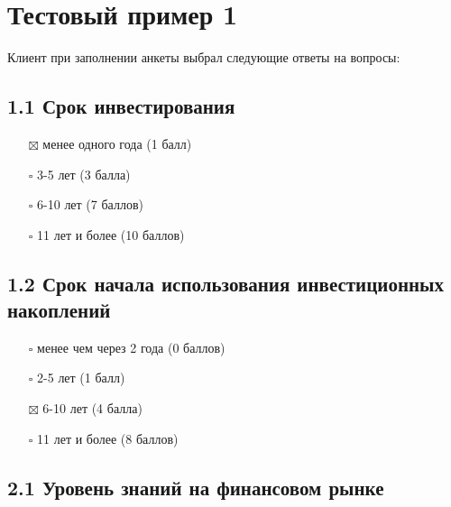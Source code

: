 \documentclass[11pt]{article}
\providecommand{\tightlist}{%
      \setlength{\itemsep}{0pt}\setlength{\parskip}{0pt}}
\begin{document}
    \section{Тестовый пример
1}\label{ux442ux435ux441ux442ux43eux432ux44bux439-ux43fux440ux438ux43cux435ux440-1}

Клиент при заполнении анкеты выбрал следующие ответы на вопросы:

\subsection{1.1 Срок
инвестирования}\label{ux441ux440ux43eux43a-ux438ux43dux432ux435ux441ux442ux438ux440ux43eux432ux430ux43dux438ux44f}

\begin{itemize}
\tightlist
\item[$\boxtimes$]
  менее одного года (1 балл)
\item[$\square$]
  3-5 лет (3 балла)
\item[$\square$]
  6-10 лет (7 баллов)
\item[$\square$]
  11 лет и более (10 баллов)
\end{itemize}

\subsection{1.2 Срок начала использования инвестиционных
накоплений}\label{ux441ux440ux43eux43a-ux43dux430ux447ux430ux43bux430-ux438ux441ux43fux43eux43bux44cux437ux43eux432ux430ux43dux438ux44f-ux438ux43dux432ux435ux441ux442ux438ux446ux438ux43eux43dux43dux44bux445-ux43dux430ux43aux43eux43fux43bux435ux43dux438ux439}

\begin{itemize}
\tightlist
\item[$\square$]
  менее чем через 2 года (0 баллов)
\item[$\square$]
  2-5 лет (1 балл)
\item[$\boxtimes$]
  6-10 лет (4 балла)
\item[$\square$]
  11 лет и более (8 баллов)
\end{itemize}

\subsection{2.1 Уровень знаний на финансовом
рынке}\label{ux443ux440ux43eux432ux435ux43dux44c-ux437ux43dux430ux43dux438ux439-ux43dux430-ux444ux438ux43dux430ux43dux441ux43eux432ux43eux43c-ux440ux44bux43dux43aux435}
\end{document}
